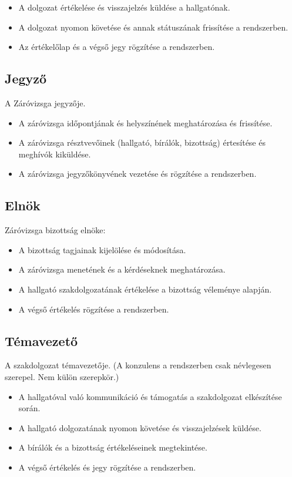 \documentclass[a4paper,12pt]{article}
\begin{document}
\begin{itemize}
	\item A dolgozat értékelése és visszajelzés küldése a hallgatónak.
	\item A dolgozat nyomon követése és annak státuszának frissítése a rendszerben.
	\item Az értékelőlap és a végső jegy rögzítése a rendszerben.
\end{itemize}

\subsection{Jegyző}

A Záróvizsga jegyzője.

\begin{itemize}
	\item A záróvizsga időpontjának és helyszínének meghatározása és frissítése.
	\item A záróvizsga résztvevőinek (hallgató, bírálók, bizottság) értesítése és meghívók kiküldése.
	\item A záróvizsga jegyzőkönyvének vezetése és rögzítése a rendszerben.
\end{itemize}

\subsection{Elnök}

Záróvizsga bizottság elnöke:

\begin{itemize}
	\item A bizottság tagjainak kijelölése és módosítása.
	\item A záróvizsga menetének és a kérdéseknek meghatározása.
	\item A hallgató szakdolgozatának értékelése a bizottság véleménye alapján.
	\item A végső értékelés rögzítése a rendszerben.
\end{itemize}

\subsection{Témavezető}

A szakdolgozat témavezetője. (A konzulens a rendszerben csak névlegesen szerepel. Nem külön szerepkör.)

\begin{itemize}
	\item A hallgatóval való kommunikáció és támogatás a szakdolgozat elkészítése során.
	\item A hallgató dolgozatának nyomon követése és visszajelzések küldése.
	\item A bírálók és a bizottság értékeléseinek megtekintése.
	\item A végső értékelés és jegy rögzítése a rendszerben.
\end{itemize}
\end{document}
